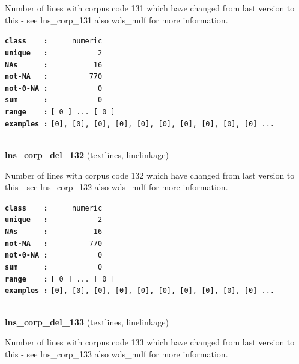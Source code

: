 \documentclass[]{article}
\begin{document}
Number of lines with corpus code 131 which have changed from last
version to this - see lns\_corp\_131 also wds\_mdf for more information.

\textbf{\texttt{class\ \ \ \ :}} \texttt{~~~~~numeric}\\
\textbf{\texttt{unique\ \ \ :}} \texttt{~~~~~~~~~~~2}\\
\textbf{\texttt{NAs\ \ \ \ \ \ :}} \texttt{~~~~~~~~~~16}\\
\textbf{\texttt{not-NA\ \ \ :}} \texttt{~~~~~~~~~770}\\
\textbf{\texttt{not-0-NA\ :}} \texttt{~~~~~~~~~~~0}\\
\textbf{\texttt{sum\ \ \ \ \ \ :}} \texttt{~~~~~~~~~~~0}\\
\textbf{\texttt{range\ \ \ \ :}}
\texttt{{[}\ 0\ {]}\ ...\ {[}\ 0\ {]}}\\
\textbf{\texttt{examples\ :}}
\texttt{{[}0{]},\ {[}0{]},\ {[}0{]},\ {[}0{]},\ {[}0{]},\ {[}0{]},\ {[}0{]},\ {[}0{]},\ {[}0{]},\ {[}0{]}\ ...}\\

~

\textbf{lns\_corp\_del\_132} (textlines, linelinkage)

Number of lines with corpus code 132 which have changed from last
version to this - see lns\_corp\_132 also wds\_mdf for more information.

\textbf{\texttt{class\ \ \ \ :}} \texttt{~~~~~numeric}\\
\textbf{\texttt{unique\ \ \ :}} \texttt{~~~~~~~~~~~2}\\
\textbf{\texttt{NAs\ \ \ \ \ \ :}} \texttt{~~~~~~~~~~16}\\
\textbf{\texttt{not-NA\ \ \ :}} \texttt{~~~~~~~~~770}\\
\textbf{\texttt{not-0-NA\ :}} \texttt{~~~~~~~~~~~0}\\
\textbf{\texttt{sum\ \ \ \ \ \ :}} \texttt{~~~~~~~~~~~0}\\
\textbf{\texttt{range\ \ \ \ :}}
\texttt{{[}\ 0\ {]}\ ...\ {[}\ 0\ {]}}\\
\textbf{\texttt{examples\ :}}
\texttt{{[}0{]},\ {[}0{]},\ {[}0{]},\ {[}0{]},\ {[}0{]},\ {[}0{]},\ {[}0{]},\ {[}0{]},\ {[}0{]},\ {[}0{]}\ ...}\\

~

\textbf{lns\_corp\_del\_133} (textlines, linelinkage)

Number of lines with corpus code 133 which have changed from last
version to this - see lns\_corp\_133 also wds\_mdf for more information.
\end{document}
